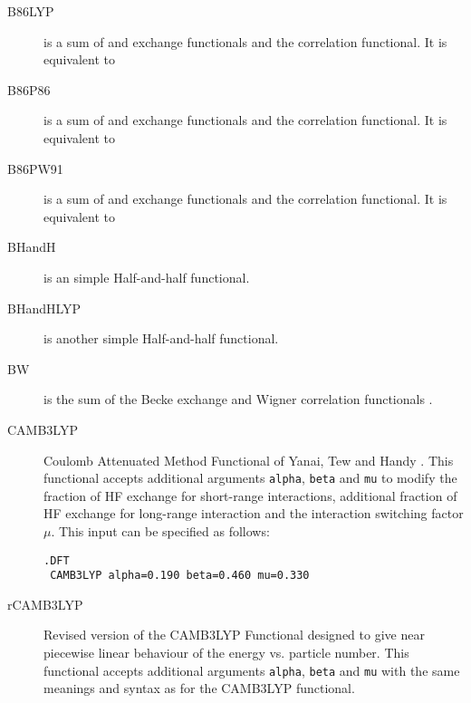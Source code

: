 \begin{description}
\item[B86LYP] is a sum of  and  exchange functionals and 
  the  correlation functional. It is equivalent to 

\item[B86P86] is a sum of  and  exchange functionals and 
  the  correlation functional. It is equivalent to 

\item[B86PW91] is a sum of  and  exchange functionals and 
  the  correlation functional.  It is equivalent to 

\item[BHandH] is an simple Half-and-half functional.

\item[BHandHLYP] is another simple Half-and-half functional.

\item[BW] is the sum of the Becke exchange and Wigner correlation
  functionals \cite{dft:wigner,dft:bw}.

\item[CAMB3LYP] Coulomb Attenuated Method Functional of Yanai, Tew and
Handy \cite{dft:camb3lyp}. This functional accepts additional arguments
\verb|alpha|, \verb|beta| and \verb|mu| to modify the fraction of HF
exchange for short-range interactions, additional fraction of HF
exchange for long-range interaction and the interaction switching
factor $\mu$. This input can be specified as follows:
\begin{verbatim}
.DFT
 CAMB3LYP alpha=0.190 beta=0.460 mu=0.330
\end{verbatim}


\item[rCAMB3LYP] Revised version of the CAMB3LYP Functional \cite{dft:rcamb3lyp} 
designed to give near piecewise linear behaviour of the energy vs. particle number. 
This functional accepts additional arguments \verb|alpha|, \verb|beta| and \verb|mu| 
with the same meanings and syntax as for the CAMB3LYP functional.


\end{description}
